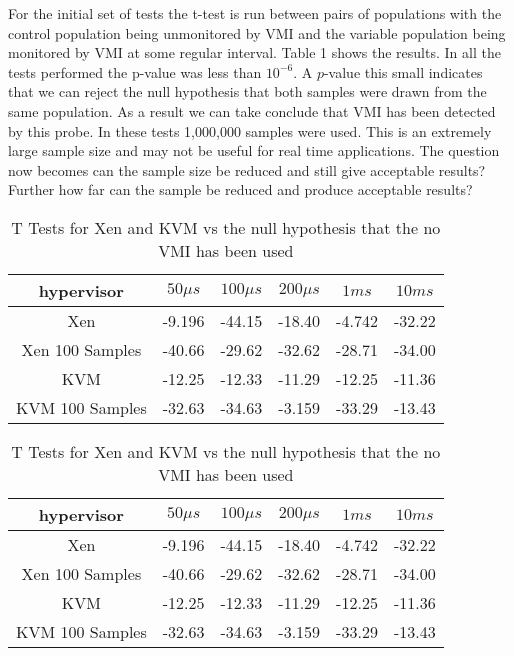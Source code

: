 For the initial set of tests the t-test is run between pairs of populations with the control population being unmonitored by VMI and the variable population being monitored by VMI at some regular interval. Table 1 shows the results. In all the tests performed the p-value was less than $10^{−6}$. A $p$-value this small indicates that we can reject the null hypothesis that both samples were drawn from the same population. As a result we can take conclude that VMI has been detected by this probe. In these tests 1,000,000 samples were used. This is an extremely large sample size and may not be useful for real time applications. The question now becomes can the sample size be reduced and still give acceptable results? Further how far can the sample be reduced and produce acceptable results? 


\begin{table}\label{TTestsCacheTiming}

  \begin{tabular}{| c | c | c | c | c | c |}
    \hline
    hypervisor & $50\mu s$ & $100\mu s$ & $200 \mu s$ & $1ms$ & $10ms$ \\ \hline
    Xen & -9.196 & -44.15 & -18.40 & -4.742 & -32.22 \\ \hline 
    Xen 100 Samples & -40.66 & -29.62 & -32.62 & -28.71 & -34.00 \\ \hline
    KVM & -12.25 & -12.33 & -11.29 & -12.25 & -11.36  \\ \hline
    KVM 100 Samples & -32.63 & -34.63 & -3.159 & -33.29 & -13.43  \\ \hline 
  \end{tabular}
  \caption{T Tests for Xen and KVM vs the null hypothesis that the no VMI has been used}
\end{table} 


\begin{table}\label{MannWhitneyCacheTiming}

  \begin{tabular}{| c | c | c | c | c | c |}
    \hline
    hypervisor & $50\mu s$ & $100\mu s$ & $200 \mu s$ & $1ms$ & $10ms$ \\ \hline
    Xen & -9.196 & -44.15 & -18.40 & -4.742 & -32.22 \\ \hline 
    Xen 100 Samples & -40.66 & -29.62 & -32.62 & -28.71 & -34.00 \\ \hline
    KVM & -12.25 & -12.33 & -11.29 & -12.25 & -11.36  \\ \hline
    KVM 100 Samples & -32.63 & -34.63 & -3.159 & -33.29 & -13.43  \\ \hline
  \end{tabular}
  \caption{T Tests for Xen and KVM vs the null hypothesis that the no VMI has been used}
\end{table}


